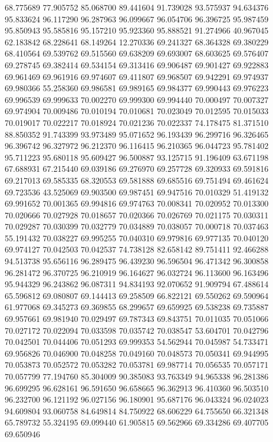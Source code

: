 68.775689
77.905752
85.068700
89.441604
91.739028
93.575937
94.634376
95.833624
96.117290
96.287963
96.099667
96.054706
96.396725
95.987459
95.850943
95.585816
95.157210
95.923360
95.888521
91.274966
40.967045
62.183842
68.228641
68.149264
12.270336
69.241327
68.364328
69.380229
68.410564
69.539762
69.515560
69.638209
69.693007
68.603625
69.576407
69.278745
69.382414
69.534154
69.313416
69.906487
69.901427
69.922883
69.961469
69.961916
69.974607
69.411807
69.968507
69.942291
69.974937
69.980366
55.258360
69.986581
69.989165
69.984377
69.990443
69.976223
69.996539
69.999633
70.002270
69.999300
69.994440
70.000497
70.007327
69.974904
70.009486
70.010194
70.010681
70.023049
70.012595
70.015033
70.019017
70.022217
70.018924
70.021236
70.022337
74.178475
81.371510
88.850352
91.743399
93.973489
95.071652
96.193439
96.299716
96.326465
96.396742
96.327972
96.212370
96.116415
96.210365
96.044723
95.781402
95.711223
95.680118
95.609427
96.500887
93.125715
91.196409
63.671198
67.688931
67.215440
69.039186
69.276970
69.257728
69.320933
69.591816
69.217013
69.585335
68.320553
69.581888
69.685516
69.751494
69.461624
69.723536
43.525069
69.903500
69.987451
69.947516
70.010329
51.419132
69.991652
70.001365
69.994816
69.974763
70.008341
70.020952
70.013300
70.020666
70.027928
70.018657
70.020366
70.026769
70.021175
70.030311
70.029287
70.030399
70.032779
70.034889
70.038057
70.000718
70.037463
55.191432
70.038227
69.995255
70.040310
69.979816
69.977135
70.040120
69.974127
70.042503
70.042537
74.738128
82.658142
89.751411
92.466288
94.513738
95.656116
96.289475
96.439230
96.596504
96.471342
96.300858
96.281472
96.370725
96.210919
96.164627
96.032724
96.113600
96.163496
95.944329
96.243862
96.087311
94.834193
92.070652
91.909794
67.488614
65.596812
69.080807
69.144413
69.258509
66.822121
69.550262
69.590964
61.977068
69.345273
69.369855
68.299657
69.659925
69.538238
69.735887
69.957661
69.981940
70.029497
69.787343
69.843751
70.011035
70.051066
70.027172
70.022094
70.033598
70.035742
70.038547
53.604701
70.042796
70.042501
70.044406
70.051293
69.999353
54.562944
70.045987
54.733471
69.956826
70.046900
70.048258
70.049160
70.048573
70.050341
69.944995
70.053873
70.052572
70.053282
70.053781
69.987714
70.056535
70.057171
70.057799
77.194760
85.304009
90.385083
93.763349
94.965338
96.281386
96.699295
96.628161
96.591650
96.658665
96.362913
96.410360
96.503510
96.232700
96.121192
96.027156
96.180901
95.687176
96.043324
96.024023
94.609804
93.060758
84.649814
84.750922
68.606229
64.755650
66.321348
65.789732
55.324195
69.099440
61.905815
69.562966
69.334286
69.407705
69.650946
